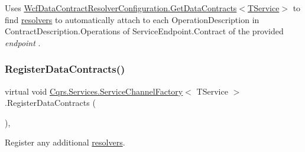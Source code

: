 Uses \hyperlink{classCqrs_1_1Services_1_1WcfDataContractResolverConfiguration_a7e9e65b16d8f64da60e160ce60628e90_a7e9e65b16d8f64da60e160ce60628e90}{Wcf\+Data\+Contract\+Resolver\+Configuration.\+Get\+Data\+Contracts$<$\+T\+Service$>$} to find \hyperlink{}{resolvers} to automatically attach to each Operation\+Description in Contract\+Description.\+Operations of Service\+Endpoint.\+Contract of the provided {\itshape endpoint} . 

\mbox{\label{classCqrs_1_1Services_1_1ServiceChannelFactory_a0ef5c8298659383821b3b8901351db42_a0ef5c8298659383821b3b8901351db42}} 
\subsubsection{\texorpdfstring{Register\+Data\+Contracts()}{RegisterDataContracts()}}
{\footnotesize\ttfamily virtual void \hyperlink{classCqrs_1_1Services_1_1ServiceChannelFactory}{Cqrs.\+Services.\+Service\+Channel\+Factory}$<$ T\+Service $>$.Register\+Data\+Contracts (\begin{DoxyParamCaption}{ }\end{DoxyParamCaption})\hspace{0.3cm}{\ttfamily [protected]}, {\ttfamily [virtual]}}



Register any additional \hyperlink{}{resolvers}. 

